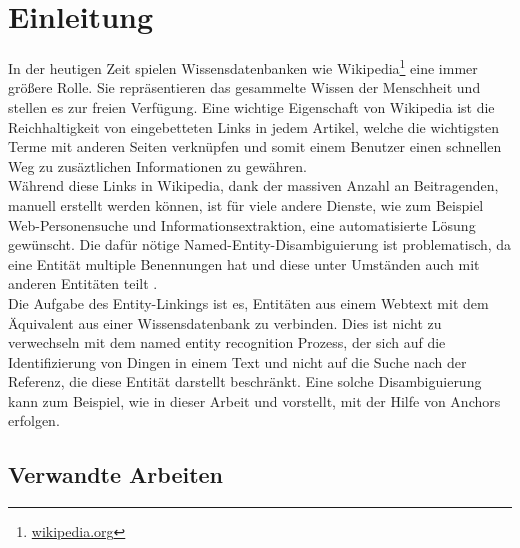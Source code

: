 \documentclass[11pt, a4paper, oneside]{Thesis} %
\begin{document}
\pagestyle{fancy} %

\chapter{Einleitung}
\label{Kapitel 1}

In der heutigen Zeit spielen Wissensdatenbanken wie Wikipedia\footnote{\url{wikipedia.org}} eine immer gr\"o\ss ere Rolle. Sie repr\"asentieren das gesammelte Wissen der Menschheit und stellen es zur freien Verf\"ugung. Eine wichtige Eigenschaft von Wikipedia ist die Reichhaltigkeit von eingebetteten Links in jedem Artikel, welche die wichtigsten Terme mit anderen Seiten verknüpfen und somit einem Benutzer einen schnellen Weg zu zus\"aztlichen Informationen zu gew\"ahren\citep{rada07}.\\
W\"ahrend diese Links in Wikipedia, dank der massiven Anzahl an Beitragenden, manuell erstellt werden k\"onnen, ist f\"ur viele andere Dienste, wie zum Beispiel Web-Personensuche und Informationsextraktion, eine automatisierte L\"osung gew\"unscht. Die daf\"ur n\"otige Named-Entity-Disambiguierung ist problematisch, da eine Entit\"at multiple Benennungen hat und diese unter Umst\"anden auch mit anderen Entit\"aten teilt \cite{wei10}.\\
Die Aufgabe des Entity-Linkings ist es, Entit\"aten aus einem Webtext mit dem \"Aquivalent aus einer Wissensdatenbank zu verbinden. Dies ist nicht zu verwechseln mit dem named entity recognition Prozess, der sich auf die Identifizierung von Dingen in einem Text und nicht auf die Suche nach der Referenz, die diese Entit\"at darstellt beschr\"ankt. Eine solche Disambiguierung kann zum Beispiel, wie in dieser Arbeit und \citep{mil08} vorstellt, mit der Hilfe von Anchors erfolgen.


\section{Verwandte Arbeiten}
\end{document}
